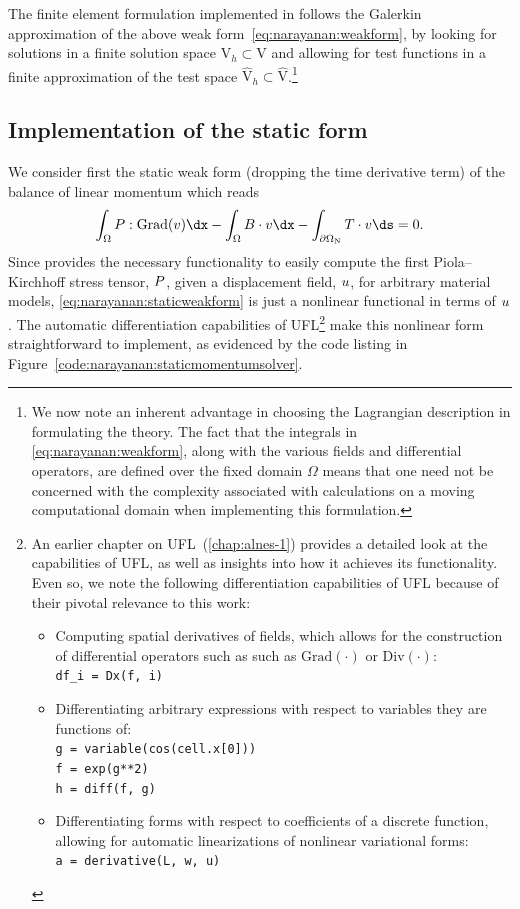The finite element formulation implemented in \twist{} follows the
Galerkin approximation of the above weak
form~\eqref{eq:narayanan:weakform}, by looking for solutions in a finite
solution space  $\mathrm{V}_{h} \subset \mathrm{V}$ and allowing for
test functions in a finite approximation of the test space
$\hat{\mathrm{V}}_{h} \subset \hat{\mathrm{V}}$.\footnote{We now
  note an inherent advantage in choosing the Lagrangian description in
  formulating the theory. The fact that the integrals in
  \eqref{eq:narayanan:weakform}, along with the various fields
  and differential operators, are defined over the fixed domain
  $\Omega$ means that one need not be concerned with the
  complexity associated with calculations on a moving computational
  domain when implementing this formulation.}

\subsection{Implementation of the static form}

We consider first the static weak form (dropping the time derivative
term) of the balance of linear momentum which reads
\begin{equation}
  \int_{\Omega} \bP:\mathrm{Grad}(\bv) \dx - \int_{\Omega} \bB
  \cdot \bv \dx -  \int_{\partial\Omega_{\mathrm{N}}} \bT \cdot
  \bv \ds = 0.
\label{eq:narayanan:staticweakform}
\end{equation}
Since \twist{} provides the necessary functionality to
easily compute the first Piola--Kirchhoff stress tensor, $\mbox{$ P$}$, given
a displacement field, $\mbox{$ u$}$, for arbitrary material models,
\eqref{eq:narayanan:staticweakform} is just a nonlinear functional in
terms of $\mbox{$ u$}$. The automatic differentiation capabilities of
UFL\footnote{An earlier chapter on UFL~(\ref{chap:alnes-1}) provides a
detailed look at the capabilities of UFL, as well as insights into how
it achieves its functionality. Even so, we note the following
differentiation capabilities of UFL because of their pivotal relevance
to this work:
\begin{itemize}
\item Computing spatial derivatives of fields, which allows for the
  construction of differential operators such as such as
  $\mathrm{Grad(\cdot)}$ or $\mathrm{Div(\cdot)}$:\\
  \texttt{df\_i = Dx(f, i)}
\item Differentiating arbitrary expressions with respect to variables
  they are functions of:\\
\texttt{g = variable(cos(cell.x[0]))}\\
\texttt{f = exp(g**2)}\\
\texttt{h = diff(f, g)}
\item Differentiating forms with respect to coefficients of a discrete
  function, allowing for automatic linearizations of nonlinear
  variational forms:\\
\texttt{a = derivative(L, w, u)}
\end{itemize}} make
this nonlinear form straightforward to implement, as evidenced by the
code listing in Figure~\ref{code:narayanan:staticmomentumsolver}.

